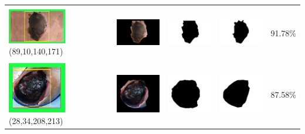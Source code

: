 \begin{table}[H]
\begin{tabular}{|m{1.0in}|m{1.0in}|m{1.0in}|m{1.0in}|m{0.6in}|}
		&  &  & \\
		\includegraphics[width=1.0in]{gambar/hasil_segmentasi/luka_hitam/image_15_rect.jpg} {\centering\fontsize{10}{10}\selectfont(89,10,140,171)}&
		\includegraphics[width=1.0in]{gambar/hasil_segmentasi/luka_hitam/result_15.jpg}&
		\includegraphics[width=1.0in]{gambar/hasil_segmentasi/luka_hitam/mask_r_15.jpg}&
		\includegraphics[width=1.0in]{gambar/hasil_segmentasi/luka_hitam/15_r.jpg}&
		91.78\% \\
		\hline
		
		&  &  & \\
		\includegraphics[width=1.0in]{gambar/hasil_segmentasi/luka_hitam/image_17_rect.jpg} {\centering\fontsize{10}{10}\selectfont(28,34,208,213)}&
		\includegraphics[width=1.0in]{gambar/hasil_segmentasi/luka_hitam/result_17.jpg}&
		\includegraphics[width=1.0in]{gambar/hasil_segmentasi/luka_hitam/mask_r_17.jpg}&
		\includegraphics[width=1.0in]{gambar/hasil_segmentasi/luka_hitam/17_r.jpg}&
		87.58\% \\
		\hline

	\end{tabular}
\end{table}

